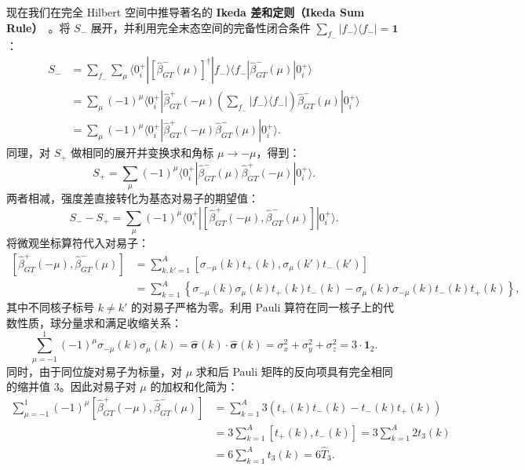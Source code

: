 现在我们在完全 Hilbert 空间中推导著名的 \textbf{Ikeda 差和定则（Ikeda Sum Rule）}~\cite{book-suhonen-from-nucleons-to-nucleus}。将 $S_-$ 展开，并利用完全末态空间的完备性闭合条件 $\sum_{f_-} |f_-\rangle \langle f_-| = \mathbf{1}$：
\begin{align}\label{eq:2-7-Sminus-derivation}
S_- &= \sum_{f_-} \sum_\mu \langle 0^+_i | [\hat{\beta}^-_{GT}(\mu)]^\dagger | f_-\rangle \langle f_- | \hat{\beta}^-_{GT}(\mu) | 0^+_i \rangle \nonumber\\
&= \sum_\mu (-1)^\mu \langle 0^+_i | \hat{\beta}^+_{GT}(-\mu) \left( \sum_{f_-} |f_-\rangle \langle f_-| \right) \hat{\beta}^-_{GT}(\mu) | 0^+_i \rangle \nonumber\\
&= \sum_\mu (-1)^\mu \langle 0^+_i | \hat{\beta}^+_{GT}(-\mu) \hat{\beta}^-_{GT}(\mu) | 0^+_i \rangle.
\end{align}
同理，对 $S_+$ 做相同的展开并变换求和角标 $\mu \to -\mu$，得到：
\begin{equation}\label{eq:2-7-Splus-derivation}
S_+ = \sum_\mu (-1)^\mu \langle 0^+_i | \hat{\beta}^-_{GT}(\mu) \hat{\beta}^+_{GT}(-\mu) | 0^+_i \rangle.
\end{equation}
两者相减，强度差直接转化为基态对易子的期望值：
\begin{equation}\label{eq:2-7-diff-commutator}
S_- - S_+ = \sum_\mu (-1)^\mu \langle 0^+_i | \left[ \hat{\beta}^+_{GT}(-\mu), \hat{\beta}^-_{GT}(\mu) \right] | 0^+_i \rangle.
\end{equation}
将微观坐标算符代入对易子：
\begin{align}\label{eq:2-7-commutator-eval}
\left[ \hat{\beta}^+_{GT}(-\mu), \hat{\beta}^-_{GT}(\mu) \right] &= \sum_{k, k'=1}^A \left[ \sigma_{-\mu}(k) t_+(k), \sigma_\mu(k') t_-(k') \right] \nonumber\\
&= \sum_{k=1}^A \left\{ \sigma_{-\mu}(k) \sigma_\mu(k) t_+(k) t_-(k) - \sigma_\mu(k) \sigma_{-\mu}(k) t_-(k) t_+(k) \right\},
\end{align}
其中不同核子标号 $k \ne k'$ 的对易子严格为零。利用 Pauli 算符在同一核子上的代数性质，球分量求和满足收缩关系：
\begin{equation}\label{eq:2-7-pauli-contraction}
\sum_{\mu=-1}^1 (-1)^\mu \sigma_{-\mu}(k) \sigma_\mu(k) = \hat{\boldsymbol{\sigma}}(k) \cdot \hat{\boldsymbol{\sigma}}(k) = \sigma_x^2 + \sigma_y^2 + \sigma_z^2 = 3 \cdot \mathbf{1}_2.
\end{equation}
同时，由于同位旋对易子为标量，对 $\mu$ 求和后 Pauli 矩阵的反向项具有完全相同的缩并值 3。因此对易子对 $\mu$ 的加权和化简为：
\begin{align}\label{eq:2-7-commutator-final}
\sum_{\mu=-1}^1 (-1)^\mu \left[ \hat{\beta}^+_{GT}(-\mu), \hat{\beta}^-_{GT}(\mu) \right] &= \sum_{k=1}^A 3 \left( t_+(k) t_-(k) - t_-(k) t_+(k) \right) \nonumber\\
&= 3 \sum_{k=1}^A [t_+(k), t_-(k)] = 3 \sum_{k=1}^A 2 t_3(k) \\
&= 6 \sum_{k=1}^A t_3(k) = 6 \hat{T}_3.
\end{align}
